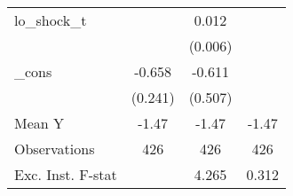 {\begin{tabular}{l*{3}{c}}
\addlinespace
lo\_shock\_t  &                     &       0.012\sym{*}  &                     \\
            &                     &     (0.006)         &                     \\
\addlinespace
\_cons      &      -0.658\sym{**} &      -0.611         &                     \\
            &     (0.241)         &     (0.507)         &                     \\
\midrule
Mean Y      &       -1.47         &       -1.47         &       -1.47         \\
Observations&         426         &         426         &         426         \\
Exc. Inst. F-stat&                     &       4.265         &       0.312         \\
\bottomrule
\end{tabular}
}
